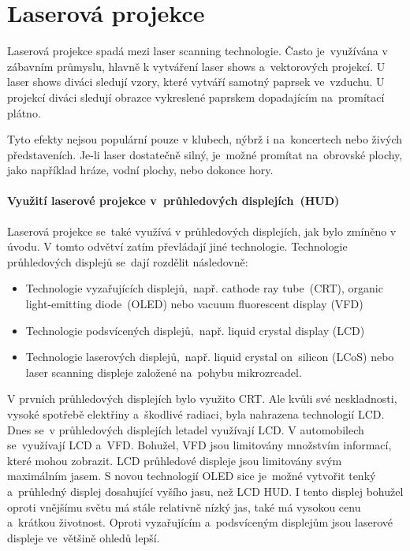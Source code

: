 \chapter{Laserová projekce~\cite{laser-projection}}
Laserová projekce spadá mezi laser scanning technologie. Často je~využívána v zábavním průmyslu, hlavně k vytváření laser shows a~vektorových projekcí. U laser shows diváci sledují vzory, které vytváří samotný paprsek ve~vzduchu. U projekcí diváci sledují obrazce vykreslené paprskem dopadajícím na~promítací plátno.

Tyto efekty nejsou populární pouze v klubech, nýbrž i na~koncertech nebo živých představeních. Je-li laser dostatečně silný, je~možné promítat na~obrovské plochy, jako například hráze, vodní plochy, nebo dokonce hory.

\subsubsection{Využití laserové projekce v~průhledových displejích~(HUD)~\cite{laser-huds}\cite{dev-of-laser-huds-in-driving}}
Laserová projekce se~také využívá v průhledových displejích, jak bylo zmíněno v úvodu. V tomto odvětví zatím převládají jiné technologie. Technologie průhledových displejů se~dají rozdělit následovně:

\begin{itemize}
  \item Technologie vyzařujících displejů,~např. cathode ray tube~(CRT), organic light-emitting diode~(OLED) nebo vacuum fluorescent display (VFD)
  \item Technologie podsvícených displejů,~např. liquid crystal display (LCD)
  \item Technologie laserových displejů,~např. liquid crystal on~silicon (LCoS) nebo laser scanning displeje založené na~pohybu mikrozrcadel.
\end{itemize}

V prvních průhledových displejích bylo využito CRT. Ale kvůli své neskladnosti, vysoké spotřebě elektřiny a~škodlivé radiaci, byla nahrazena technologií LCD. Dnes se~v průhledových displejích letadel využívají LCD. V automobilech se~využívají LCD a~VFD.
Bohužel, VFD jsou limitovány množstvím informací, které mohou zobrazit. LCD průhledové displeje jsou limitovány svým maximálním jasem.
S novou technologií OLED sice je~možné vytvořit tenký a~průhledný displej dosahující vyšího jasu, než LCD HUD.
I tento displej bohužel oproti vnějšímu světu má stále relativně nízký jas, také má vysokou cenu a~krátkou životnost.
Oproti vyzařujícím a~podsvíceným displejům jsou laserové displeje ve~většině ohledů lepší. 

